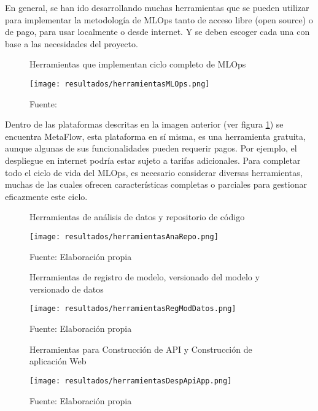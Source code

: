 En general, se han ido desarrollando muchas herramientas que se pueden utilizar para implementar la metodología de MLOps tanto de acceso libre (open source) o de pago, para usar localmente o desde internet. Y se deben escoger cada una con base a las necesidades del proyecto.

\begin{figure}[h]
	\centering
	\caption{Herramientas que implementan ciclo completo de MLOps}
	\texttt{[image: resultados/herramientasMLOps.png]}
	\caption*{\footnotesize Fuente: \cite{neptune2024}}
	\label{fig:figuraHerramientasMLOps}
\end{figure}

\newpage

Dentro de las plataformas descritas en la imagen anterior (ver figura \ref{fig:figuraHerramientasMLOps}) se encuentra MetaFlow, esta plataforma en sí misma, es una herramienta gratuita, aunque algunas de sus funcionalidades pueden requerir pagos. Por ejemplo, el despliegue en internet podría estar sujeto a tarifas adicionales. Para completar todo el ciclo de vida del MLOps, es necesario considerar diversas herramientas, muchas de las cuales ofrecen características completas o parciales para gestionar eficazmente este ciclo.

\begin{figure}[h]
	\centering
	\caption{Herramientas de análisis de datos y repositorio de código}
	\texttt{[image: resultados/herramientasAnaRepo.png]}
	\caption*{\footnotesize Fuente: Elaboración propia}
	\label{fig:figuraHerramientasAnaRepo}
\end{figure}

\newpage

\begin{figure}[h]
	\centering
	\caption{Herramientas de registro de modelo, versionado del modelo y versionado de datos}
	\texttt{[image: resultados/herramientasRegModDatos.png]}
	\caption*{\footnotesize Fuente: Elaboración propia}
	\label{fig:figuraHerramientasRegModDatos}
\end{figure}

\begin{figure}[h]
	\centering
	\caption{Herramientas para Construcción de API y Construcción de aplicación Web}
	\texttt{[image: resultados/herramientasDespApiApp.png]}
	\caption*{\footnotesize Fuente: Elaboración propia}
	\label{fig:figuraHerramientasDespApiApp}
\end{figure}

